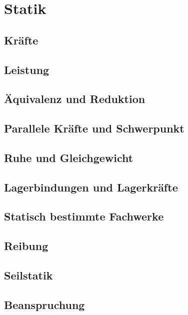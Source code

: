 \chapter{Statik}
\section{Kräfte}

\section{Leistung}
\section{Äquivalenz und Reduktion}

\section{Parallele Kräfte und Schwerpunkt}

\section{Ruhe und Gleichgewicht}

\section{Lagerbindungen und Lagerkräfte}

\section{Statisch bestimmte Fachwerke}

\section{Reibung}

\section{Seilstatik}
\section{Beanspruchung}